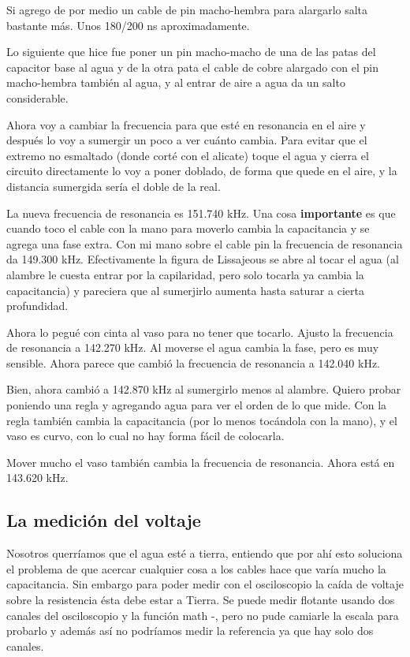 Si agrego de por medio un cable de pin macho-hembra para alargarlo salta bastante más. Unos 180/200 ns aproximadamente. 

Lo siguiente que hice fue poner un pin macho-macho de una de las patas del capacitor base al agua y de la otra pata el cable de cobre alargado con el pin macho-hembra también al agua, y al entrar de aire a agua da un salto considerable.

Ahora voy a cambiar la frecuencia para que esté en resonancia en el aire y después lo voy a sumergir un poco a ver cuánto cambia.
Para evitar que el extremo no esmaltado (donde corté con el alicate) toque el agua y cierra el circuito directamente lo voy a poner doblado, de forma que quede en el aire, y la distancia sumergida sería el doble de la real.

La nueva frecuencia de resonancia es 151.740 kHz. Una cosa \textbf{importante} es que cuando toco el cable con la mano para moverlo cambia la capacitancia y se agrega una fase extra. Con mi mano sobre el cable pin la frecuencia de resonancia da 149.300 kHz. Efectivamente la figura de Lissajeous se abre al tocar el agua (al alambre le cuesta entrar por la capilaridad, pero solo tocarla ya cambia la capacitancia) y pareciera que al sumerjirlo aumenta hasta saturar a cierta profundidad. 


Ahora lo pegué con cinta al vaso para no tener que tocarlo. Ajusto la frecuencia de resonancia a 142.270 kHz. Al moverse el agua cambia la fase, pero es muy sensible. Ahora parece que cambió la frecuencia de resonancia a 142.040 kHz.

Bien, ahora cambió a 142.870 kHz al sumergirlo menos al alambre. Quiero probar poniendo una regla y agregando agua para ver el orden de lo que mide. Con la regla también cambia la capacitancia (por lo menos tocándola con la mano), y el vaso es curvo, con lo cual no hay forma fácil de colocarla. 

Mover mucho el vaso también cambia la frecuencia de resonancia. Ahora está en 143.620 kHz.  

\subsection*{La medición del voltaje}
Nosotros querríamos que el agua esté a tierra, entiendo que por ahí esto soluciona el problema de que acercar cualquier cosa a los cables hace que varía mucho la capacitancia. Sin embargo para poder medir con el osciloscopio la caída de voltaje sobre la resistencia ésta debe estar a Tierra. Se puede medir flotante usando dos canales del osciloscopio y la función math -, pero
no pude camiarle la escala para probarlo y además así no podríamos medir la referencia ya que hay solo dos canales.

